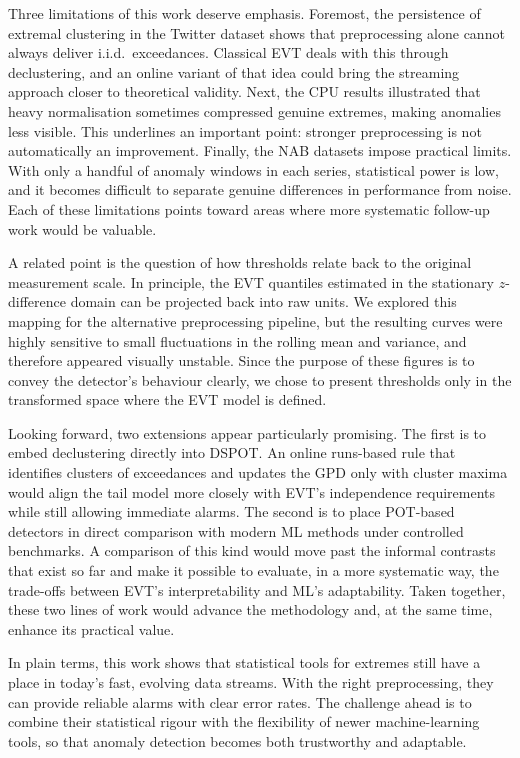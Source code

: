 \documentclass{statsmsc}
\begin{document}
Three limitations of this work deserve emphasis. Foremost, the persistence of extremal clustering in the Twitter dataset shows
that preprocessing alone cannot always deliver i.i.d.\ exceedances. Classical EVT deals with this through declustering, 
and an online variant of that idea could bring the streaming approach closer to theoretical validity. Next, the CPU results
illustrated that heavy normalisation sometimes compressed genuine extremes, making anomalies less visible. This underlines
an important point: stronger preprocessing is not automatically an improvement. Finally, the NAB datasets impose practical 
limits. With only a handful of anomaly windows in each series, statistical power is low, and it becomes difficult to separate
genuine differences in performance from noise. Each of these limitations points toward areas where more systematic follow-up
work would be valuable.

A related point is the question of how thresholds relate back to the original measurement scale. In principle, 
the EVT quantiles estimated in the stationary $z$-difference domain can be projected back into raw units. We explored
this mapping for the alternative preprocessing pipeline, but the resulting curves were highly sensitive to small fluctuations
in the rolling mean and variance, and therefore appeared visually unstable. Since the purpose of these figures is to convey
the detector’s behaviour clearly, we chose to present thresholds only in the transformed space where the EVT model is defined.

Looking forward, two extensions appear particularly promising. The first is to embed declustering directly into DSPOT. 
An online runs-based rule that identifies clusters of exceedances and updates the GPD only with cluster maxima would align
the tail model more closely with EVT’s independence requirements while still allowing immediate alarms. The second is to 
place POT-based detectors in direct comparison with modern ML methods under controlled benchmarks. A comparison of this 
kind would move past the informal contrasts that exist so far and make it possible to evaluate, in a more systematic way,
the trade-offs between EVT’s interpretability and ML’s adaptability. Taken together, these two lines of work would advance
the methodology and, at the same time, enhance its practical value.

In plain terms, this work shows that statistical tools for extremes still have a place in today’s fast, evolving data streams.
With the right preprocessing, they can provide reliable alarms with clear error rates. The challenge ahead is 
to combine their statistical rigour with the flexibility of newer machine-learning tools, so that anomaly detection becomes
both trustworthy and adaptable.
\end{document}
